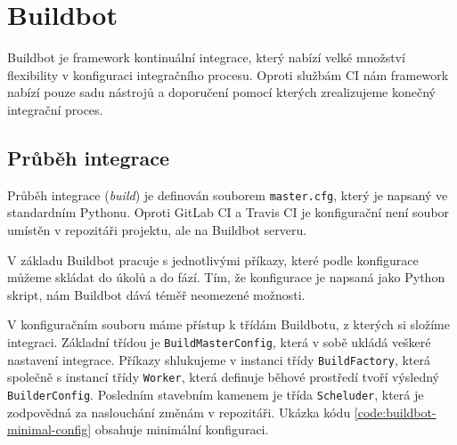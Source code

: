 \section{Buildbot}

Buildbot je framework kontinuální integrace, který nabízí velké množství flexibility v konfiguraci integračního procesu.
Oproti službám CI nám framework nabízí pouze sadu nástrojů a doporučení pomocí kterých zrealizujeme konečný integrační proces.

\subsection{Průběh integrace}

Průběh integrace (\textit{build}) je definován souborem \verb|master.cfg|, který je napsaný ve standardním Pythonu.
Oproti GitLab CI a Travis CI je konfigurační není soubor umístěn v repozitáři projektu, ale na Buildbot serveru.

V základu Buildbot pracuje s jednotlivými příkazy, které podle konfigurace můžeme skládat do úkolů a do fází.
Tím, že konfigurace je napsaná jako Python skript, nám Buildbot dává téměř neomezené možnosti.

V konfiguračním souboru máme přístup k třídám Buildbotu, z kterých si složíme integraci.
Základní třídou je \verb|BuildMasterConfig|, která v sobě ukládá veškeré nastavení integrace.
Příkazy shlukujeme v instanci třídy \verb|BuildFactory|, která společně s instancí třídy \verb|Worker|, která definuje běhové prostředí tvoří výsledný \verb|BuilderConfig|.
Posledním stavebním kamenem je třída \verb|Scheluder|, která je zodpovědná za naslouchání změnám v repozitáři.
Ukázka kódu \ref{code:buildbot-minimal-config} obsahuje minimální konfiguraci.

